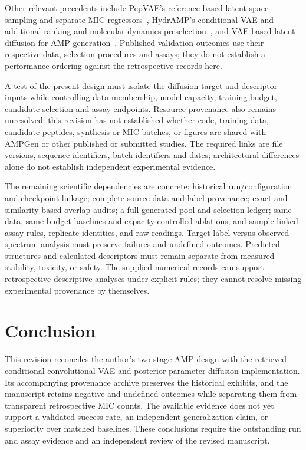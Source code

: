 \documentclass[journal]{IEEEtran}
\begin{document}
Other relevant precedents include PepVAE's reference-based latent-space sampling and separate MIC regressors~\cite{li2021pepvae}, HydrAMP's conditional VAE and additional ranking and molecular-dynamics preselection~\cite{szymczak2023discovering}, and VAE-based latent diffusion for AMP generation~\cite{jin2024artificial}. Published validation outcomes use their respective data, selection procedures and assays; they do not establish a performance ordering against the retrospective records here.

A test of the present design must isolate the diffusion target and descriptor inputs while controlling data membership, model capacity, training budget, candidate selection and assay endpoints. Resource provenance also remains unresolved: this revision has not established whether code, training data, candidate peptides, synthesis or MIC batches, or figures are shared with AMPGen or other published or submitted studies. The required links are file versions, sequence identifiers, batch identifiers and dates; architectural differences alone do not establish independent experimental evidence.

The remaining scientific dependencies are concrete: historical run/configuration and checkpoint linkage; complete source data and label provenance; exact and similarity-based overlap audits; a full generated-pool and selection ledger; same-data, same-budget baselines and capacity-controlled ablations; and sample-linked assay rules, replicate identities, and raw readings. Target-label versus observed-spectrum analysis must preserve failures and undefined outcomes. Predicted structures and calculated descriptors must remain separate from measured stability, toxicity, or safety. The supplied numerical records can support retrospective descriptive analyses under explicit rules; they cannot resolve missing experimental provenance by themselves.

\section{Conclusion}
This revision reconciles the author's two-stage AMP design with the retrieved conditional convolutional VAE and posterior-parameter diffusion implementation. Its accompanying provenance archive preserves the historical exhibits, and the manuscript retains negative and undefined outcomes while separating them from transparent retrospective MIC counts. The available evidence does not yet support a validated success rate, an independent generalization claim, or superiority over matched baselines. These conclusions require the outstanding run and assay evidence and an independent review of the revised manuscript.
\end{document}
